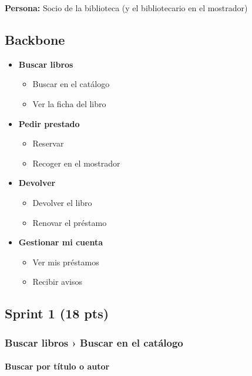 \documentclass[11pt,a4paper]{article}
\begin{document}
\textbf{Persona:} Socio de la biblioteca (y el bibliotecario en el mostrador)

\subsection*{Backbone}

\begin{itemize}
\item \textbf{Buscar libros}

\begin{itemize}
\item Buscar en el catálogo
\item Ver la ficha del libro
\end{itemize}
\item \textbf{Pedir prestado}

\begin{itemize}
\item Reservar
\item Recoger en el mostrador
\end{itemize}
\item \textbf{Devolver}

\begin{itemize}
\item Devolver el libro
\item Renovar el préstamo
\end{itemize}
\item \textbf{Gestionar mi cuenta}

\begin{itemize}
\item Ver mis préstamos
\item Recibir avisos
\end{itemize}
\end{itemize}

\subsection*{Sprint 1 (18 pts)}

\subsubsection*{Buscar libros › Buscar en el catálogo}

\paragraph*{Buscar por título o autor}
\end{document}
